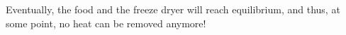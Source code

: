 Eventually, the food and the freeze dryer will reach equilibrium, and thus, at some point, no heat can be removed anymore!